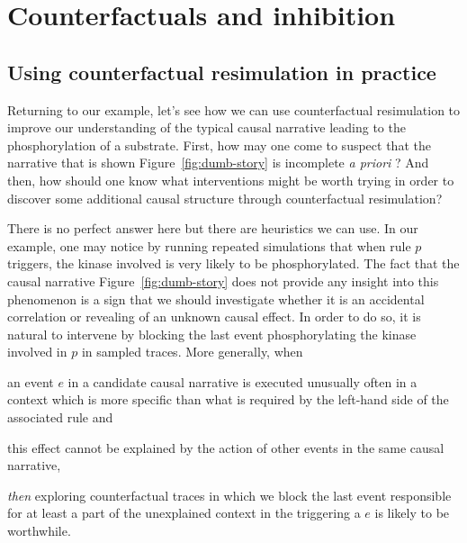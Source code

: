 
\section{Counterfactuals and inhibition}\label{sec:inhibition}

\subsection{Using counterfactual resimulation in practice}
\label{sec:practice}

Returning to our example, let's see how we can use counterfactual
resimulation to improve our understanding of the typical causal
narrative leading to the phosphorylation of a substrate. First, how
may one come to suspect that the narrative that is shown
Figure~\ref{fig:dumb-story} is incomplete \textit{a priori} ? And
then, how should one know what interventions might be worth trying in
order to discover some additional causal structure through
counterfactual resimulation?

There is no perfect answer here but there are heuristics we can
use. In our example, one may notice by running repeated simulations
that when rule $p$ triggers, the kinase involved is very likely to be
phosphorylated. The fact that the causal narrative
Figure~\ref{fig:dumb-story} does not provide any insight into this
phenomenon is a sign that we should investigate whether it is
an accidental correlation or revealing of an unknown causal effect. In
order to do so, it is natural to intervene by blocking the last event
phosphorylating the kinase involved in $p$ in sampled traces. More
generally, when
\begin{inparaenum}[(i)]
\item an event $e$ in a candidate causal narrative is executed
  unusually often in a context which is more specific than what is
  required by the left-hand side of the associated rule and
\item this effect cannot be explained by the action of other events in
  the same causal narrative,
\end{inparaenum}
\textit{then} exploring counterfactual traces in which we block the last event
responsible for at least a part of the unexplained context in the
triggering a $e$ is likely to be worthwhile.

